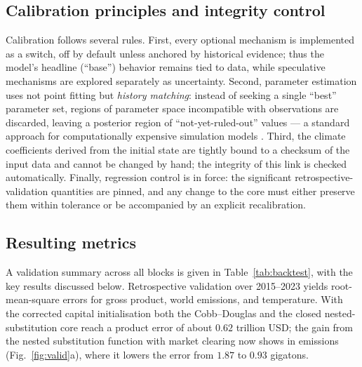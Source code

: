 \documentclass[11pt,a4paper]{article}
\begin{document}
\subsection{Calibration principles and integrity control}

Calibration follows several rules. First, every optional mechanism is implemented as a switch, off
by default unless anchored by historical evidence; thus the model's headline (``base'') behavior
remains tied to data, while speculative mechanisms are explored separately as uncertainty. Second,
parameter estimation uses not point fitting but \emph{history matching}: instead of seeking a single
``best'' parameter set, regions of parameter space incompatible with observations are discarded,
leaving a posterior region of ``not-yet-ruled-out'' values --- a standard approach for
computationally expensive simulation models \citep{williamson2013}. Third, the climate coefficients
derived from the initial state are tightly bound to a checksum of the input data and cannot be
changed by hand; the integrity of this link is checked automatically. Finally, regression control is
in force: the significant retrospective-validation quantities are pinned, and any change to the core
must either preserve them within tolerance or be accompanied by an explicit recalibration.

\subsection{Resulting metrics}

A validation summary across all blocks is given in Table~\ref{tab:backtest}, with the key results
discussed below. Retrospective validation over 2015--2023 yields root-mean-square errors for gross
product, world emissions, and temperature. With the corrected capital initialisation both the
Cobb--Douglas and the closed nested-substitution core reach a product error of about $0.62$ trillion
USD; the gain from the nested substitution function with market clearing now shows in emissions
(Fig.~\ref{fig:valid}a), where it lowers the error from $1.87$ to $0.93$ gigatons.
\end{document}
